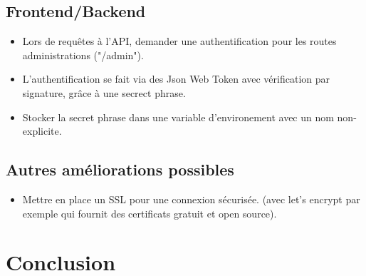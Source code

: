 \documentclass[a4paper]{article}
\begin{document}
\subsection{Frontend/Backend}
\begin{itemize}
\item Lors de requêtes à l'API, demander une authentification pour les routes administrations ("/admin").
\item L'authentification se fait via des Json Web Token avec vérification par signature, grâce à une secrect phrase.
\item Stocker la secret phrase dans une variable d'environement avec un nom non-explicite.
\end{itemize}

\subsection{Autres améliorations possibles}
\begin{itemize}
\item Mettre en place un SSL pour une connexion sécurisée. (avec let's encrypt par exemple qui fournit des certificats gratuit et open source).
\end{itemize}
\section{Conclusion}
\end{document}
